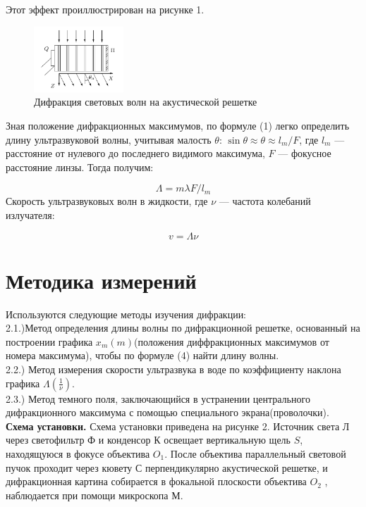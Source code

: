 \documentclass[a4paper,12pt]{article}
\begin{document}
	Этот эффект проиллюстрирован на рисунке 1.
	\begin{figure}[h!]
		\centering	
		\includegraphics[width=0.3\textwidth]{difraction.png}
		\caption{Дифракция световых волн на акустической решетке}
		\label{diff}
	\end{figure}
    Зная положение дифракционных максимумов, по формуле (1) легко определить длину ультразвуковой волны, учитывая малость $ \theta $: $ \sin \theta \approx \theta \approx l_m /F  $, где $ l_m $ --- расстояние от нулевого до последнего видимого максимума, $ F $ --- фокусное расстояние линзы. Тогда получим:
    	
    	\begin{equation}\label{}
    	 \Lambda = m \lambda F/ l_m 
    	\end{equation}
    	Скорость ультразвуковых волн в жидкости, где $ \nu $ --- частота колебаний излучателя:
    	
    \begin{equation}\label{}
    	v = \Lambda \nu 
    \end{equation}
    
   
	\section*{Методика измерений}
Используются следующие методы изучения дифракции:\\
2.1.)Метод определения длины волны по дифракционной решетке, основанный на построении графика $x_{m}(m)$(положения диффракционных максимумов от номера максимума), чтобы по формуле (4) найти длину волны.\\ 
2.2.) Метод измерения скорости ультразвука в воде по коэффициенту наклона графика $\Lambda (\frac{1}{\nu})$.\\
2.3.) Метод темного поля, заключающийся в устранении центрального дифракционного максимума с помощью специального экрана(проволочки).\\
 \textbf{Схема установки. }Схема установки приведена на рисунке 2. Источник света Л через светофильтр Ф и конденсор К освещает вертикальную щель $ S $, находящуюся в фокусе объектива $ O_1 $. После объектива параллельный световой пучок проходит через кювету С перпендикулярно акустической решетке, и дифракционная картина собирается в фокальной плоскости объектива $ O_2 $ , наблюдается при помощи микроскопа М.
\end{document}
